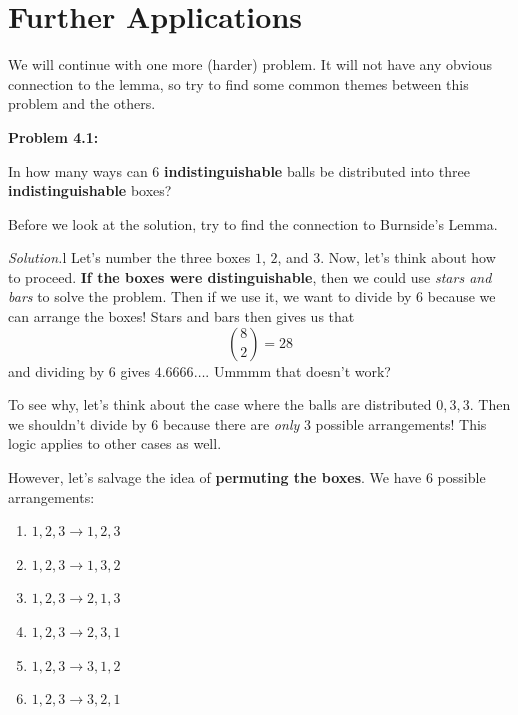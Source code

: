 \documentclass[11pt]{scrartcl}
\begin{document}
\section{Further Applications}

We will continue with one more (harder) problem. It will not have any obvious connection to the lemma, so try to find some common themes between this problem and the others.

\begin{tcolorbox}[colback=red!5!white,colframe=red!75!black]
  \color{red} \textbf{Problem 4.1:} \color{black}
  \vspace{0.1cm}
  
  In how many ways can $6$ \color{blue} \textbf{indistinguishable} \color{black} balls be distributed into three \color{blue} \textbf{indistinguishable} \color{black} boxes?
\end{tcolorbox}

Before we look at the solution, try to find the connection to Burnside's Lemma. 

\newpage

\color{orange} \textit{Solution.}\color{black}\color{white}l\color{black} Let's number the three boxes $1$, $2$, and $3$. Now, let's think about how to proceed. \color{blue} \textbf{If the boxes were distinguishable}\color{black}, then we could use \textit{stars and bars} to solve the problem. Then if we use it, we want to divide by $6$ because we can arrange the boxes! Stars and bars then gives us that \[\binom{8}{2} = 28\] and dividing by $6$ gives $4.6666\dots$. Ummmm that doesn't work?
\vspace{0.1cm}

To see why, let's think about the case where the balls are distributed $0,3,3$. Then we shouldn't divide by $6$ because there are \textit{only} $3$ possible arrangements! This logic applies to other cases as well.
\vspace{0.1cm}

However, let's salvage the idea of \color{blue} \textbf{permuting the boxes}\color{black}. We have $6$ possible arrangements:
\begin{enumerate}
    \item $1,2,3 \rightarrow 1,2,3$
    \item $1,2,3 \rightarrow 1,3,2$
    \item $1,2,3 \rightarrow 2,1,3$
    \item $1,2,3 \rightarrow 2,3,1$
    \item $1,2,3 \rightarrow 3,1,2$
    \item $1,2,3 \rightarrow 3,2,1$
\end{enumerate}
\end{document}
